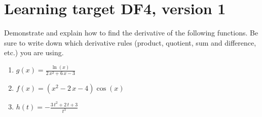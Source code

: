 \section{Learning target DF4, version 1}
\providecommand{\stxKnowl}{}\renewcommand{\stxKnowl}[1]{#1}
\providecommand{\stxOuttro}{}\renewcommand{\stxOuttro}[1]{#1}
\providecommand{\stxTitle}{}\renewcommand{\stxTitle}[1]{#1}
\renewcommand{\stxOuttro}[1]{}
\stxKnowl{
 Demonstrate and explain how to find the derivative of the following functions. Be sure to write down which derivative rules (product, quotient, sum and difference, etc.) you are using.

\begin{enumerate}
\item
\stxKnowl{
\(\renewcommand{\log}{\ln} g(x)= \frac{\log\left(x\right)}{2 \, x^{2} + 6 \, x - 3}\)

\stxOuttro{
\[\renewcommand{\log}{\ln} g' (x)= -\frac{2 \, {\left(2 \, x + 3\right)} \log\left(x\right)}{{\left(2 \, x^{2} + 6 \, x - 3\right)}^{2}} + \frac{1}{{\left(2 \, x^{2} + 6 \, x - 3\right)} x}\]

}
}
\vfill
\item
\stxKnowl{
\(\renewcommand{\log}{\ln} f(x)= {\left(x^{2} - 2 \, x - 4\right)} \cos\left(x\right)\)

\stxOuttro{
\[\renewcommand{\log}{\ln} f' (x)= 2 \, {\left(x - 1\right)} \cos\left(x\right) - {\left(x^{2} - 2 \, x - 4\right)} \sin\left(x\right)\]

}
}
\vfill
\item
\stxKnowl{
\(\renewcommand{\log}{\ln} h(t)= -\frac{3 \, t^{2} + 2 \, t + 3}{t^{3}}\)

\stxOuttro{
\[\renewcommand{\log}{\ln} h' (t)= \frac{3 \, t^{2} + 4 \, t + 9}{t^{4}}\]

}
}
\vfill
\end{enumerate}
}

\pagebreak

